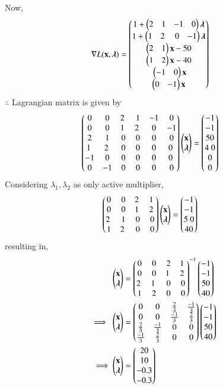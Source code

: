 \documentclass[journal,12pt,twocolumn]{IEEEtran}
\begin{document}
Now,
\begin{align}
\nabla L(\vec{x},\boldsymbol{\lambda}) &= \myvec{1+ \myvec{2 & 1 & -1 & 0 }\boldsymbol{\lambda}\\ 1+\myvec{1 & 2 & 0 & -1}\boldsymbol{\lambda} \\ \myvec{2 & 1}\vec{x}-50\\ \myvec{1& 2}\vec{x}-40 \\  \myvec{-1 & 0}\vec{x} \\ \myvec{0 & -1}\vec{x}}
\end{align}
$\therefore$ Lagrangian matrix is given by
\begin{align}
\myvec{0 & 0 & 2 & 1& -1 & 0 \\ 0 & 0 & 1 & 2  & 0 & -1 \\ 2 & 1 & 0 & 0 & 0 & 0 \\ 1 & 2 & 0 & 0 & 0 & 0  \\ -1 & 0 & 0 & 0 & 0 & 0  \\ 0 & -1 & 0 & 0 & 0 & 0 }\myvec{\vec{x} \\ \boldsymbol{\lambda} } &= \myvec{-1 \\ -1 \\ 50\\ 4 0\\ 0 \\0 }
\end{align}
Considering $\lambda_1,\lambda_2$ as only active multiplier,
\begin{align}
\myvec{0 & 0 & 2 & 1 \\ 0 & 0 & 1 & 2 \\ 2 & 1 & 0 & 0 \\ 1 & 2 & 0 & 0}\myvec{\vec{x}\\ \boldsymbol{\lambda}} &= \myvec{-1 \\ -1 \\ 5 0\\ 40}
\end{align}
resulting in,
\begin{align}
\myvec{\vec{x} \\ \boldsymbol{\lambda}} &= \myvec{0 & 0 & 2 & 1 \\ 0 & 0 & 1 & 2 \\ 2 & 1 & 0 & 0 \\ 1& 2 & 0 & 0}^{-1}\myvec{-1 \\ -1 \\ 50 \\ 40}
\\
\implies   \myvec{\vec{x} \\ \boldsymbol{\lambda}} &= \myvec{0 & 0 & \frac{2}{3} & \frac{-1}{3} \\ 0 & 0 & \frac{-1}{3} & \frac{2}{3} \\ \frac{2}{3} & \frac{-1}{3} & 0 & 0 \\ \frac{-1}{3} & \frac{2}{3} & 0 & 0}\myvec{-1 \\ -1 \\ 50 \\ 40}
\\
\implies \myvec{\vec{x} \\ \boldsymbol{\lambda}} &= \myvec{20 \\ 10 \\ -0.3 \\ -0.3 }
\end{align}
\end{document}
